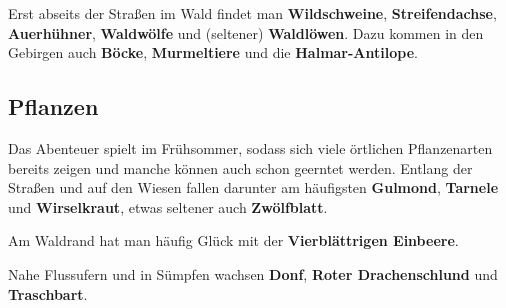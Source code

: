 Erst abseits der Straßen im Wald findet man \textbf{Wildschweine}, \textbf{Streifendachse}, \textbf{Auerhühner}, \textbf{Waldwölfe} und (seltener) \textbf{Waldlöwen}. Dazu kommen in den Gebirgen auch \textbf{Böcke}, \textbf{Murmeltiere} und die \textbf{Halmar-Antilope}.

\neuespalte

\subsection*{Pflanzen}
Das Abenteuer spielt im Frühsommer, sodass sich viele örtlichen Pflanzenarten bereits zeigen und manche können auch schon geerntet werden. Entlang der Straßen und auf den Wiesen fallen darunter am häufigsten \textbf{Gulmond}, \textbf{Tarnele} und \textbf{Wirselkraut}, etwas seltener auch \textbf{Zwölfblatt}.

Am Waldrand hat man häufig Glück mit der \textbf{Vierblättrigen Einbeere}.

Nahe Flussufern und in Sümpfen wachsen \textbf{Donf}, \textbf{Roter Drachenschlund} und \textbf{Traschbart}.

\spaltenende
\neueseite
\spaltenanfang





